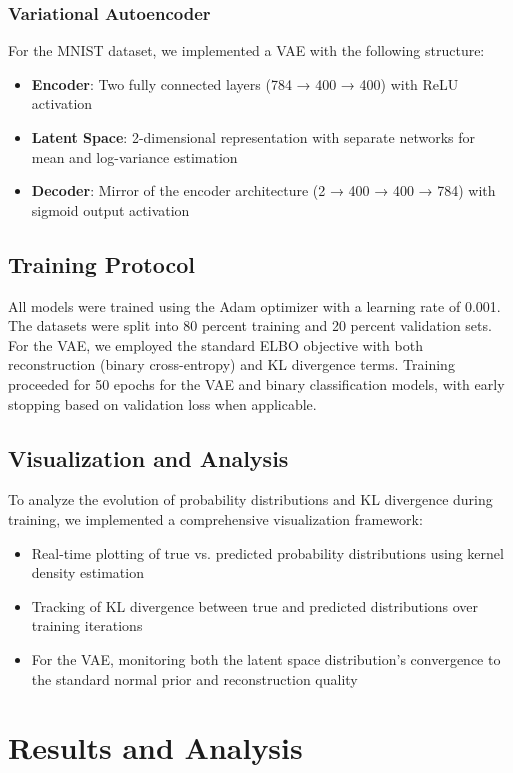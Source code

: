 \documentclass[preprint,12pt]{elsarticle}
\begin{document}
\subsubsection{Variational Autoencoder}
For the MNIST dataset, we implemented a VAE with the following structure:
\begin{itemize}
    \item \textbf{Encoder}: Two fully connected layers (784 → 400 → 400) with ReLU activation
    \item \textbf{Latent Space}: 2-dimensional representation with separate networks for mean and log-variance estimation
    \item \textbf{Decoder}: Mirror of the encoder architecture (2 → 400 → 400 → 784) with sigmoid output activation
\end{itemize}

\subsection{Training Protocol}
All models were trained using the Adam optimizer with a learning rate of 0.001. The datasets were split into 80 percent training and 20 percent validation sets. For the VAE, we employed the standard ELBO objective with both reconstruction (binary cross-entropy) and KL divergence terms. Training proceeded for 50 epochs for the VAE and binary classification models, with early stopping based on validation loss when applicable.

\subsection{Visualization and Analysis}
To analyze the evolution of probability distributions and KL divergence during training, we implemented a comprehensive visualization framework:
\begin{itemize}
    \item Real-time plotting of true vs. predicted probability distributions using kernel density estimation
    \item Tracking of KL divergence between true and predicted distributions over training iterations
    \item For the VAE, monitoring both the latent space distribution's convergence to the standard normal prior and reconstruction quality
\end{itemize}

\section{Results and Analysis}
\end{document}
